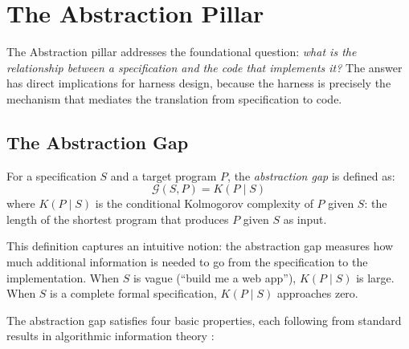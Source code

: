 \section{The Abstraction Pillar}
\label{sec:abstraction}

The Abstraction pillar \citep{pillar-abstraction} addresses the foundational question: \emph{what is the relationship between a specification and the code that implements it?} The answer has direct implications for harness design, because the harness is precisely the mechanism that mediates the translation from specification to code.

\subsection{The Abstraction Gap}

\begin{definition}
\label{def:abstraction-gap}
For a specification $S$ and a target program $P$, the \emph{abstraction gap} is defined as:
\begin{equation}
    \mathcal{G}(S, P) = K(P \mid S)
\end{equation}
where $K(P \mid S)$ is the conditional Kolmogorov complexity of $P$ given $S$: the length of the shortest program that produces $P$ given $S$ as input.
\end{definition}

This definition captures an intuitive notion: the abstraction gap measures how much additional information is needed to go from the specification to the implementation. When $S$ is vague (``build me a web app''), $K(P \mid S)$ is large. When $S$ is a complete formal specification, $K(P \mid S)$ approaches zero.

The abstraction gap satisfies four basic properties, each following from standard results in algorithmic information theory \citep{li2019introduction}:

